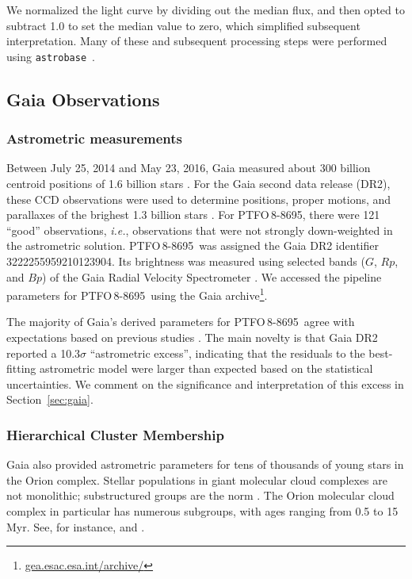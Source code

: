 \documentclass[12pt,twocolumn,tighten]{aastex62}
\newcommand{\ptfo}{PTFO$\,$8-8695}
\begin{document}
We normalized the light curve by dividing out the median flux, and
then opted to subtract 1{.}0 to set the median value to zero, which
simplified subsequent interpretation.  Many of these and subsequent
processing steps were performed using
\texttt{astrobase}~\citep{bhatti_astrobase_2018}. 


\subsection{Gaia Observations}

\subsubsection{Astrometric measurements}

Between July 25, 2014 and May 23, 2016, Gaia measured about 300
billion centroid positions of 1{.}6 billion stars
\citep{gaia_collaboration_gaia_2016,lindegren_gaiasoln_2018,gaia_collaboration_gaia_2018}.
For the Gaia second data release (DR2), these CCD observations were
used to determine positions, proper motions, and parallaxes of the
brighest 1{.}3 billion stars \citep{lindegren_gaiasoln_2018}.  For
\ptfo, there were 121 ``good'' observations, {\it i.e.}, observations
that were not strongly down-weighted in the astrometric solution.
\ptfo\ was assigned the Gaia DR2 identifier 3222255959210123904.  Its
brightness was measured using selected bands ($G$, $Rp$, and $Bp$) of
the Gaia Radial Velocity Spectrometer
\citep{cropper_gaia_2018,evans_gaia_2018}.  We accessed the pipeline
parameters for \ptfo\ using the Gaia
archive\footnote{\url{gea.esac.esa.int/archive/}}.

The majority of Gaia's derived parameters for \ptfo\ agree with
expectations based on previous studies
\citep{briceno_cida_2005,van_eyken_ptf_2012}.  The main novelty is
that Gaia DR2 reported a 10.3$\sigma$ ``astrometric excess'',
indicating that the residuals to the best-fitting astrometric model
were larger than expected based on the statistical uncertainties.  We
comment on the significance and interpretation of this excess in
Section~\ref{sec:gaia}.


\subsubsection{Hierarchical Cluster Membership}
\label{subsec:hierarchical}

Gaia also provided astrometric parameters for tens of thousands of
young stars in the Orion complex.  Stellar populations in giant
molecular cloud complexes are not monolithic; substructured groups are
the norm \citep{briceno_lowmassOB_2007}.  The Orion molecular cloud
complex in particular has numerous subgroups, with ages ranging from
0.5 to 15$\,$Myr. See, for instance,
\citet{briceno_cida_2005,jeffries_kinematic_2006,briceno_25_2007,kounkel_apogee2_2018}
and \citet{briceno_cidaII_2019}.
\end{document}
